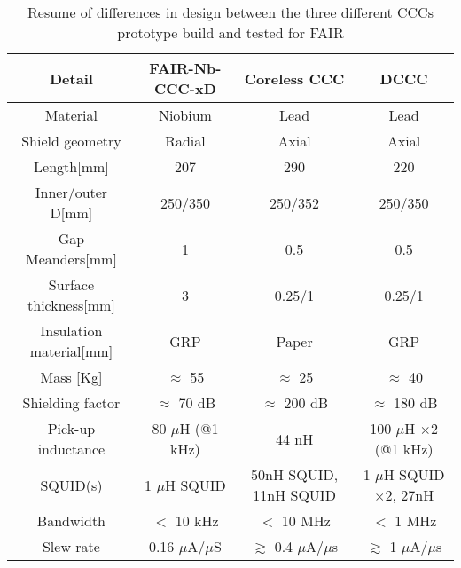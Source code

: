 \documentclass[12pt,a4paper]{report}
\begin{document}
       \begin{table}[ht]
       	\begin{tabular}{c|c|c|c}
       		\hline
       		Detail & FAIR-Nb-CCC-xD & Coreless CCC & DCCC \\
       		\hline
       		Material & Niobium & Lead & Lead \\
       		\hline
       		Shield geometry & Radial & Axial & Axial \\
       		\hline
       		Length[mm] & 207 & 290 & 220 \\
       		\hline
       		Inner/outer D[mm] & 250/350 & 250/352 & 250/350 \\
       		\hline
       		Gap Meanders[mm] & 1 & 0.5 & 0.5 \\
       		\hline
       		Surface thickness[mm] & 3 & 0.25/1 & 0.25/1 \\
       		\hline
       		Insulation material[mm] & GRP & Paper & GRP \\
       		\hline
       		Mass [Kg] & $\approx$ 55 & $\approx$ 25 & $\approx$ 40\\
       		\hline
       		Shielding factor & $\approx$ 70 dB & $\approx$ 200 dB & $\approx$ 180 dB \\
       		\hline
       		Pick-up inductance & 80 $\mu$H (@1 kHz) & 44 nH & 100 $\mu$H $\times 2$ (@1 kHz) \\
       		\hline
       		SQUID(s) & 1 $\mu$H SQUID & 50nH SQUID, 11nH SQUID & 1 $\mu$H SQUID$\times 2$, 27nH  \\
       		\hline
       		Bandwidth & $<$ 10 kHz & $<$ 10 MHz & $<$ 1 MHz \\
       		\hline
       		Slew rate & 0.16 $\mu$A/$\mu$S \cite{DavidThesis} & $\gtrsim$ 0.4 $\mu$A/$\mu$s  & $\gtrsim$ 1 $\mu$A/$\mu$s \\
       		\hline
       	\end{tabular}
       	\caption{Resume of differences in design between the three different CCCs prototype build and tested for FAIR}
       	\label{CH3_table}
       \end{table}
       
\end{document}
